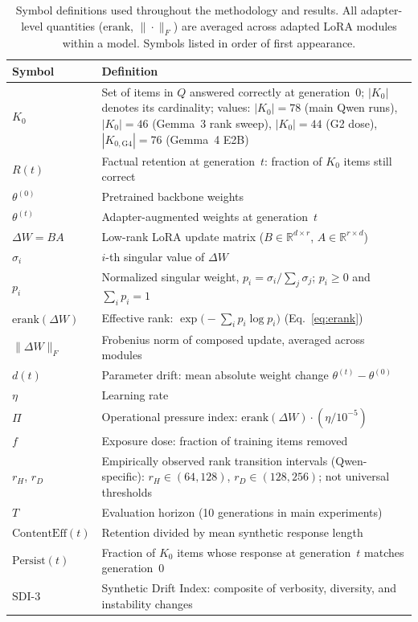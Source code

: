 \documentclass[a4paper,fleqn]{cas-dc}
\newif\ifshowchanges
\newcommand{\rev}[1]{\ifshowchanges{\color{blue}#1}\else{#1}\fi}
\begin{document}
\begin{table}[pos=htbp]
\caption{Symbol definitions used throughout the methodology and results.
All adapter-level quantities ($\mathrm{erank}$, $\|\cdot\|_F$) are averaged
across adapted LoRA modules within a model. Symbols listed in order of
first appearance.}
\label{tab:notation}
\small
\begin{tabular*}{\columnwidth}{@{\extracolsep{\fill}}l>{\raggedright\arraybackslash}p{}}
\toprule
\textbf{Symbol} & \textbf{Definition} \\
\midrule
$K_0$
  & Set of items in $Q$ answered correctly at generation~0;
    $|K_0|$ denotes its cardinality;
    values: $|K_0|=78$ (main Qwen runs),
            $|K_0|=46$ (Gemma~3 rank sweep),
            $|K_0|=44$ (G2 dose),
            \rev{$|K_{0,\mathrm{G4}}|=76$ (Gemma~4 E2B)} \\
$R(t)$
  & Factual retention at generation~$t$: fraction of $K_0$ items
    still correct \\
$\theta^{(0)}$
  & Pretrained backbone weights \\
$\theta^{(t)}$
  & Adapter-augmented weights at generation~$t$ \\
$\Delta W = BA$
  & Low-rank LoRA update matrix
    ($B \in \mathbb{R}^{d\times r}$, $A \in \mathbb{R}^{r\times d}$) \\
$\sigma_i$
  & $i$-th singular value of $\Delta W$ \\
$p_i$
  & Normalized singular weight,
    $p_i = \sigma_i / \sum_j \sigma_j$;
    $p_i \ge 0$ and $\sum_i p_i = 1$ \\
$\mathrm{erank}(\Delta W)$
  & Effective rank:
    $\exp\!\bigl(-\sum_i p_i \log p_i\bigr)$
    (Eq.~\ref{eq:erank}) \\
$\|\Delta W\|_F$
  & Frobenius norm of composed update, averaged across modules \\
$d(t)$
  & Parameter drift: mean absolute weight change
    $\theta^{(t)}-\theta^{(0)}$ \\
$\eta$
  & Learning rate \\
$\Pi$
  & Operational pressure index:
    $\mathrm{erank}(\Delta W)\cdot(\eta/10^{-5})$ \\
$f$
  & Exposure dose: fraction of training items removed \\
$r_H$, $r_D$
  & Empirically observed rank transition intervals (Qwen-specific):
    $r_H \in (64,128)$, $r_D \in (128,256)$;
    not universal thresholds \\
$T$
  & Evaluation horizon (10 generations in main experiments) \\
$\mathrm{ContentEff}(t)$
  & Retention divided by mean synthetic response length \\
$\mathrm{Persist}(t)$
  & Fraction of $K_0$ items whose response at generation~$t$
    matches generation~0 \\
$\mathrm{SDI\text{-}3}$
  & Synthetic Drift Index: composite of verbosity, diversity,
    and instability changes \\
\bottomrule
\end{tabular*}
\end{table}
\end{document}
